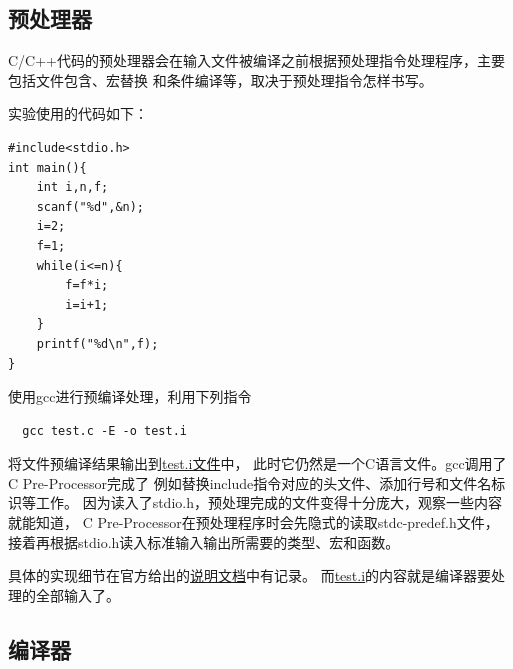 \documentclass[UTF8,a4paper,10pt]{ctexart}
\begin{document}
\subsection{预处理器}
C/C++代码的预处理器会在输入文件被编译之前根据预处理指令处理程序，主要包括文件包含、宏替换
和条件编译等，取决于预处理指令怎样书写。
\par
实验使用的代码如下：
\begin{lstlisting}
#include<stdio.h>
int main(){
    int i,n,f;
    scanf("%d",&n);
    i=2;
    f=1;
    while(i<=n){
        f=f*i;
        i=i+1;
    }
    printf("%d\n",f);
}
\end{lstlisting}
\par
使用gcc进行预编译处理，利用下列指令
\begin{lstlisting}
  gcc test.c -E -o test.i
\end{lstlisting}
将文件预编译结果输出到\href{run:./test/test.i}{test.i文件}中，
此时它仍然是一个C语言文件。gcc调用了C Pre-Processor完成了
例如替换include指令对应的头文件、添加行号和文件名标识等工作。
因为读入了stdio.h，预处理完成的文件变得十分庞大，观察一些内容就能知道，
C Pre-Processor在预处理程序时会先隐式的读取stdc-predef.h文件，
接着再根据stdio.h读入标准输入输出所需要的类型、宏和函数。
\par
具体的实现细节在官方给出的\href{run:./cpp.pdf}{说明文档}中有记录。
而\href{run:./test/test.i}{test.i}的内容就是编译器要处理的全部输入了。

\subsection{编译器}
\end{document}
